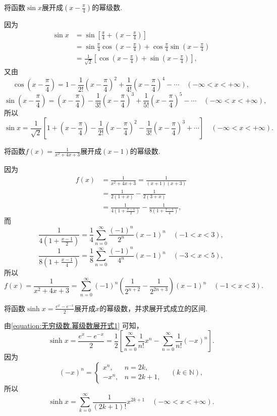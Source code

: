 \begin{example}
将函数\(\sin x\)展开成\(\left(x-\frac{\pi}{4}\right)\)的幂级数.
\begin{solution}
因为\[
\begin{split}
\sin x &= \sin\left[\frac{\pi}{4}+\left(x-\frac{\pi}{4}\right)\right] \\
&= \sin\frac{\pi}{4} \cos\left(x-\frac{\pi}{4}\right) + \cos\frac{\pi}{4} \sin\left(x-\frac{\pi}{4}\right) \\
&= \frac{1}{\sqrt{2}} \left[\cos\left(x-\frac{\pi}{4}\right) + \sin\left(x-\frac{\pi}{4}\right)\right],
\end{split}
\]又由\[
\cos\left(x-\frac{\pi}{4}\right)
= 1 - \frac{1}{2!} \left(x-\frac{\pi}{4}\right)^2 + \frac{1}{4!} \left(x-\frac{\pi}{4}\right)^4 - \dotsb
\quad(-\infty < x < +\infty),
\]\[
\sin\left(x-\frac{\pi}{4}\right)
= \left(x-\frac{\pi}{4}\right) - \frac{1}{3!} \left(x-\frac{\pi}{4}\right)^3 + \frac{1}{5!} \left(x-\frac{\pi}{4}\right)^5 - \dotsb
\quad(-\infty < x < +\infty),
\]所以\[
\sin x = \frac{1}{\sqrt{2}} \left[
1 + \left(x-\frac{\pi}{4}\right)
- \frac{1}{2!} \left(x-\frac{\pi}{4}\right)^2
- \frac{1}{3!} \left(x-\frac{\pi}{4}\right)^3
+ \dotsb
\right]
\quad(-\infty < x < +\infty).
\]
\end{solution}
\end{example}

\begin{example}
将函数\(f(x) = \frac{1}{x^2+4x+3}\)展开成\((x-1)\)的幂级数.
\begin{solution}
因为\[
\begin{split}
f(x) &= \frac{1}{x^2+4x+3}
= \frac{1}{(x+1)(x+3)} \\
&= \frac{1}{2(1+x)} - \frac{1}{2(3+x)} \\
&= \frac{1}{4\left(1+\frac{x-1}{2}\right)}
- \frac{1}{8\left(1+\frac{x-1}{4}\right)},
\end{split}
\]而\[
\frac{1}{4\left(1+\frac{x-1}{2}\right)}
= \frac{1}{4} \sum\limits_{n=0}^\infty \frac{(-1)^n}{2^n} (x-1)^n
\quad(-1<x<3),
\]\[
\frac{1}{8\left(1+\frac{x-1}{4}\right)}
= \frac{1}{8} \sum\limits_{n=0}^\infty \frac{(-1)^n}{4^n} (x-1)^n
\quad(-3<x<5),
\]所以\[
f(x) = \frac{1}{x^2+4x+3}
= \sum\limits_{n=0}^\infty (-1)^n \left(\frac{1}{2^{n+2}}-\frac{1}{2^{2n+3}}\right) (x-1)^n
\quad(-1<x<3).
\]
\end{solution}
\end{example}

\begin{example}
将函数\(\sinh x = \frac{e^x - e^{-x}}{2}\)展开成\(x\)的幂级数，并求展开式成立的区间.
\begin{solution}
由\cref{equation:无穷级数.幂级数展开式1} 可知，\[
\sinh x
= \frac{e^x - e^{-x}}{2}
= \frac{1}{2} \left[
\sum\limits_{n=0}^\infty \frac{1}{n!} x^n
- \sum\limits_{n=0}^\infty \frac{1}{n!} (-x)^n
\right].
\]因为\[
(-x)^n = \left\{ \begin{array}{cl}
x^n, & n=2k, \\
-x^n, & n=2k+1,
\end{array} \right.
\quad(k\in\mathbb{N}),
\]所以\[
\sinh x
= \sum\limits_{k=0}^\infty \frac{1}{(2k+1)!} x^{2k+1}
\quad(-\infty<x<+\infty).
\]
\end{solution}
\end{example}

